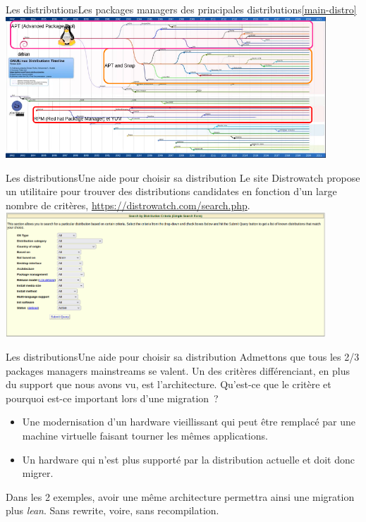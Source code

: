 \documentclass{beamer}
\begin{document}
    \begin{frame}{Les distributions}{Les packages managers des principales distributions\cref{main-distro}}
        \centering
        \includegraphics[width=12cm]{image/main-distro-package-manager.drawio}
    \end{frame}

    \begin{frame}{Les distributions}{Une aide pour choisir sa distribution}
        Le site Distrowatch propose un utilitaire pour trouver des distributions candidates en fonction d'un large nombre de critères, \url{https://distrowatch.com/search.php}.
        \bigbreak
        \centering
        \includegraphics[width=12cm]{image/distrowatch-search}
    \end{frame}

    \begin{frame}{Les distributions}{Une aide pour choisir sa distribution}
        Admettons que tous les 2/3 packages managers mainstreams se valent.
        \bigbreak
        Un des critères différenciant, en plus du support que nous avons vu, est l'architecture.
        \bigbreak
        Qu'est-ce que le critère  et pourquoi est-ce important lors d'une migration~?
        \pause
        \bigbreak
        \begin{itemize}
            \item Une modernisation d'un hardware vieillissant qui peut être remplacé par une machine virtuelle faisant tourner les mêmes applications.
            \item Un hardware qui n'est plus supporté par la distribution actuelle et doit donc migrer.
        \end{itemize}
        Dans les 2 exemples, avoir une même architecture permettra ainsi une migration plus \textit{lean}.
        Sans rewrite, voire, sans recompilation.
    \end{frame}
\end{document}
